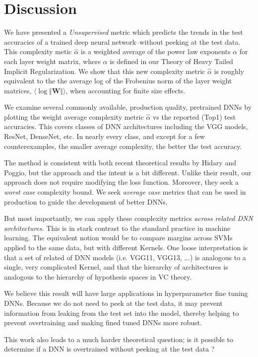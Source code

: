 \vspace{-4mm}
\section{Discussion}
\label{sxn:discussion}
\vspace{-3mm}

We have presented a \emph{Unsupervised} metric which  predicts the trends in the test accuracies of a trained deep neural network--without peeking at the test data. This complexity metic $\hat{\alpha}$ is a weighted average of the power law exponents $\alpha$ for each layer weight matrix, where 
$\alpha$ is defined in our Theory of Heavy Tailed Implicit Regularization.   We show that this new complexity metric $\hat{\alpha}$ is roughly equivalent to the the average log of the Frobenius norm of the layer weight matrices, $\langle\log\Vert\mathbf{W}\Vert\rangle$, when accounting for finite size effects.

We examine several  commonly available, production quality, pretrained DNNs  by plotting  the weight average complexity metric $\hat{\alpha}$ vs the reported (Top1) test accuracies. This covers classes of DNN architectures including the VGG models, ResNet, DenseNet, etc.  In nearly every class, and except for a few counterexamples, the smaller average complexity, the better the test accuracy.

The method is consistent with both recent theoretical results by Hidary and Poggio, but the approach and the intent is a bit different. 
Unlike their result, our approach does not require modifying the loss function.
Moreover, they seek a \emph{worst case} complexity bound.  We seek \emph{average case} metrics that can be used in production
to guide the development of better DNNs.

But most importantly, we can apply these complexity metrics \emph{across related DNN architectures}. This is in stark contrast to the standard practice in machine learning.  The equivalent notion would be to compare margins across SVMs  applied to the same data, but with different Kernels.  One loose interpretation is that a set of related of DNN models
(i.e. VGG11, VGG13, ...) is analogous to a single, very complicated Kernel, and that the hierarchy of architectures is analogous to the hierarchy of hypothesis spaces in VC theory. 

We believe this result will have large applications in hyperparameter fine tuning DNNs.  Because we do not need to peek at the test data, it may prevent information from leaking from the test set into the model, thereby helping to prevent overtraining and making fined tuned DNNs more robust.

This work also leads to a much harder theoretical question; is it possible to determine if a DNN is overtrained without peeking at the test data ?  

